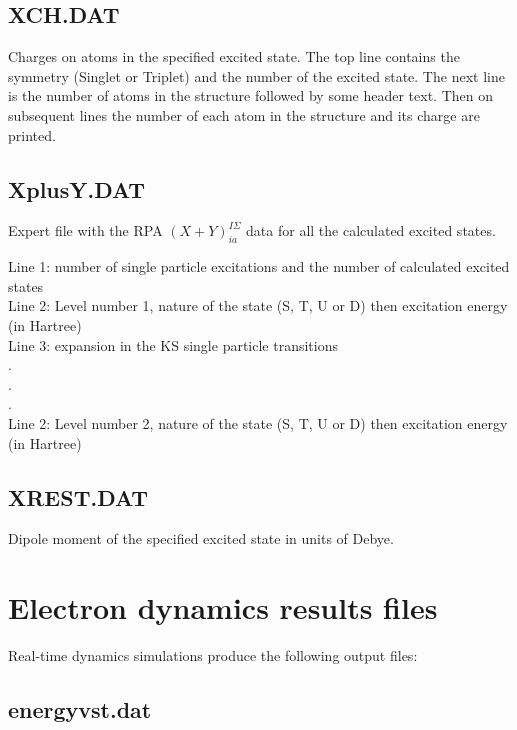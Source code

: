 \subsection{XCH.DAT}

Charges on atoms in the specified excited state. The top line contains the
symmetry (Singlet or Triplet) and the number of the excited state. The next line
is the number of atoms in the structure followed by some header text. Then on
subsequent lines the number of each atom in the structure and its charge are
printed.

\subsection{XplusY.DAT}

Expert file with the RPA  $(X+Y)^{I\Sigma}_{ia}$ data for all the calculated
excited states.

Line 1: number of single particle excitations and the number of calculated
excited states\\
Line 2: Level number 1, nature of the state (S, T, U or D) then excitation
energy (in Hartree)\\
Line 3: expansion in the KS single particle transitions\\
.\\
.\\
.\\
Line 2: Level number 2, nature of the state (S, T, U or D) then excitation
energy (in Hartree)\\

\subsection{XREST.DAT}

Dipole moment of the specified excited state in units of Debye.

\section{Electron dynamics results files}
\label{sec:tddftb_rt}

Real-time dynamics simulations produce the following output files:

\subsection{energyvst.dat}

